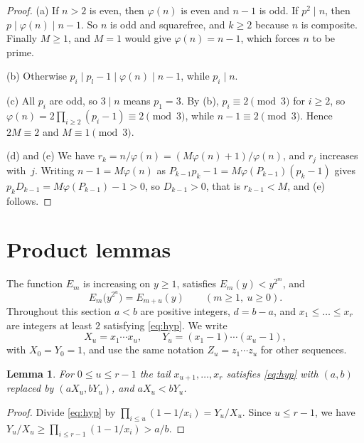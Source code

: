 \documentclass[11pt,reqno]{amsart}
\numberwithin{equation}{section}
\theoremstyle{plain}
\newtheorem{lemma}[theorem]{Lemma}
\theoremstyle{definition}
\theoremstyle{remark}
\begin{document}
\begin{proof}
(a) If $n>2$ is even, then $\varphi(n)$ is even and $n-1$ is odd. If
$p^2\mid n$, then $p\mid\varphi(n)\mid n-1$. So $n$ is odd and
squarefree, and $k\ge2$ because $n$ is composite. Finally $M\ge1$, and
$M=1$ would give $\varphi(n)=n-1$, which forces $n$ to be prime.

(b) Otherwise $p_i\mid p_l-1\mid\varphi(n)\mid n-1$, while $p_i\mid n$.

(c) All $p_i$ are odd, so $3\mid n$ means $p_1=3$. By (b),
$p_i\equiv2\pmod3$ for $i\ge2$, so
$\varphi(n)=2\prod_{i\ge2}(p_i-1)\equiv2\pmod3$, while
$n-1\equiv2\pmod3$. Hence $2M\equiv2$ and $M\equiv1\pmod3$.

(d) and (e) We have $r_k=n/\varphi(n)=(M\varphi(n)+1)/\varphi(n)$, and
$r_j$ increases with~$j$. Writing $n-1=M\varphi(n)$ as
$P_{k-1}p_k-1=M\varphi(P_{k-1})(p_k-1)$ gives
$p_kD_{k-1}=M\varphi(P_{k-1})-1>0$, so $D_{k-1}>0$, that is
$r_{k-1}<M$, and (e) follows.
\end{proof}

\section{Product lemmas}\label{sec:lemmas}

The function $E_m$ is increasing on $y\ge1$, satisfies
$E_m(y)<y^{2^m}$, and
\begin{equation}\label{eq:Ecomp}
  E_m\bigl(y^{2^u}\bigr)=E_{m+u}(y)\qquad(m\ge1,\ u\ge0).
\end{equation}
Throughout this section $a<b$ are positive integers, $d=b-a$, and
$x_1\le\dots\le x_r$ are integers at least $2$ satisfying
\eqref{eq:hyp}. We write
\[
  X_u=x_1\cdots x_u,\qquad Y_u=(x_1-1)\cdots(x_u-1),
\]
with $X_0=Y_0=1$, and use the same notation $Z_u=z_1\cdots z_u$ for
other sequences.

\begin{lemma}\label{lem:tail}
For $0\le u\le r-1$ the tail $x_{u+1},\dots,x_r$ satisfies
\eqref{eq:hyp} with $(a,b)$ replaced by $(aX_u,bY_u)$, and
$aX_u<bY_u$.
\end{lemma}

\begin{proof}
Divide \eqref{eq:hyp} by $\prod_{i\le u}(1-1/x_i)=Y_u/X_u$. Since
$u\le r-1$, we have $Y_u/X_u\ge\prod_{i\le r-1}(1-1/x_i)>a/b$.
\end{proof}
\end{document}

